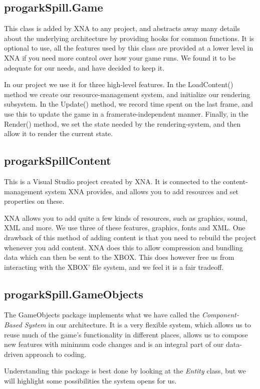 \subsection{progarkSpill.Game}
This class is added by XNA to any project, and abstracts away many details
about the underlying architecture by providing hooks for common functions.
It is optional to use, all the features used by this class are provided at
a lower level in XNA if you need more control over how your game runs. We
found it to be adequate for our needs, and have decided to keep it.

In our project we use it for three high-level features. In the LoadContent()
method we create our resource-management system, and initialize our rendering
subsystem.  In the Update() method, we record time spent on the last frame, and
use this to update the game in a framerate-independent manner. Finally, in the
Render() method, we set the state needed by the rendering-system, and then
allow it to render the current state.

\subsection{progarkSpillContent}
This is a Visual Studio project created by XNA.  It is connected to the
content-management system XNA provides, and allows you to add resources and set
properties on these.

XNA allows you to add quite a few kinds of resources, such as graphics, sound, 
XML and more. We use three of these features, graphics, fonts and XML. One
drawback of this method of adding content is that you need to rebuild the
project whenever you add content. XNA does this to allow compression and 
bundling data which can then be sent to the XBOX. This does however free us
from interacting with the XBOX' file system, and we feel it is a fair tradeoff.

\subsection{progarkSpill.GameObjects}
The GameObjects package implements what we have called the 
\emph{Component-Based System} in our architecture. It is a very flexible 
system, which allows
us to reuse much of the game's functionality in different places, allows us
to compose new features with minimum code changes and is an integral part of
our data-driven approach to coding.

Understanding this package is best done by looking at the \emph{Entity} class,
but we will highlight some possibilities the system opens for us.

